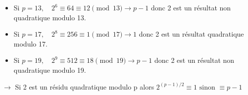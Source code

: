 \begin{solution}
\begin{itemize}
        \item Si $p = 13, \quad 2^6 \equiv 64 \equiv 12 \pmod{13} \rightarrow p-1$ donc 2 est un résultat non quadratique modulo 13.

        \item Si $p = 17, \quad 2^8 \equiv 256 \equiv 1 \pmod{17} \rightarrow 1$ donc 2 est un résultat quadratique modulo 17.

        \item Si $p = 19, \quad 2^9 \equiv 512 \equiv 18 \pmod{19} \rightarrow p-1$ donc 2 est un résultat non quadratique modulo 19.

    \end{itemize}

    $\rightarrow$ Si 2 est un résidu quadratique modulo p alors $2^{(p-1)/2} \equiv 1 \text{ sinon } \equiv p - 1$
\end{solution}
